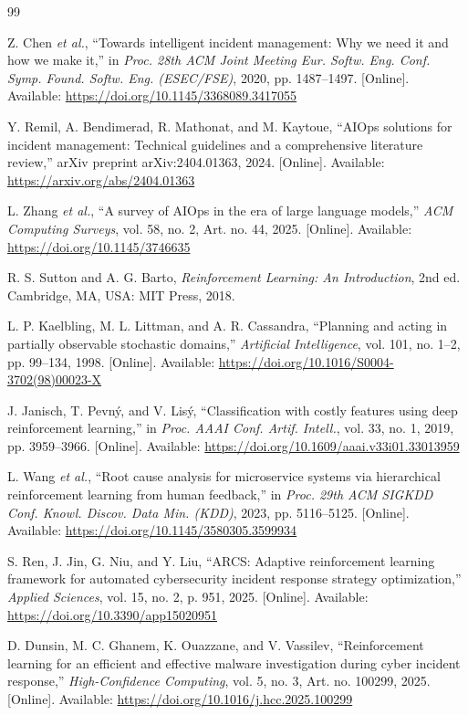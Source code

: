 \documentclass[12pt,a4paper]{article}
\begin{document}
\begin{thebibliography}{99}

 Z. Chen \emph{et al.}, ``Towards intelligent incident management: Why we need it and how we make it,'' in \emph{Proc. 28th ACM Joint Meeting Eur. Softw. Eng. Conf. Symp. Found. Softw. Eng. (ESEC/FSE)}, 2020, pp. 1487--1497. [Online]. Available: \url{https://doi.org/10.1145/3368089.3417055}

 Y. Remil, A. Bendimerad, R. Mathonat, and M. Kaytoue, ``AIOps solutions for incident management: Technical guidelines and a comprehensive literature review,'' arXiv preprint arXiv:2404.01363, 2024. [Online]. Available: \url{https://arxiv.org/abs/2404.01363}

 L. Zhang \emph{et al.}, ``A survey of AIOps in the era of large language models,'' \emph{ACM Computing Surveys}, vol. 58, no. 2, Art. no. 44, 2025. [Online]. Available: \url{https://doi.org/10.1145/3746635}

 R. S. Sutton and A. G. Barto, \emph{Reinforcement Learning: An Introduction}, 2nd ed. Cambridge, MA, USA: MIT Press, 2018.

 L. P. Kaelbling, M. L. Littman, and A. R. Cassandra, ``Planning and acting in partially observable stochastic domains,'' \emph{Artificial Intelligence}, vol. 101, no. 1--2, pp. 99--134, 1998. [Online]. Available: \url{https://doi.org/10.1016/S0004-3702(98)00023-X}

 J. Janisch, T. Pevn\'{y}, and V. Lis\'{y}, ``Classification with costly features using deep reinforcement learning,'' in \emph{Proc. AAAI Conf. Artif. Intell.}, vol. 33, no. 1, 2019, pp. 3959--3966. [Online]. Available: \url{https://doi.org/10.1609/aaai.v33i01.33013959}

 L. Wang \emph{et al.}, ``Root cause analysis for microservice systems via hierarchical reinforcement learning from human feedback,'' in \emph{Proc. 29th ACM SIGKDD Conf. Knowl. Discov. Data Min. (KDD)}, 2023, pp. 5116--5125. [Online]. Available: \url{https://doi.org/10.1145/3580305.3599934}

 S. Ren, J. Jin, G. Niu, and Y. Liu, ``ARCS: Adaptive reinforcement learning framework for automated cybersecurity incident response strategy optimization,'' \emph{Applied Sciences}, vol. 15, no. 2, p. 951, 2025. [Online]. Available: \url{https://doi.org/10.3390/app15020951}

 D. Dunsin, M. C. Ghanem, K. Ouazzane, and V. Vassilev, ``Reinforcement learning for an efficient and effective malware investigation during cyber incident response,'' \emph{High-Confidence Computing}, vol. 5, no. 3, Art. no. 100299, 2025. [Online]. Available: \url{https://doi.org/10.1016/j.hcc.2025.100299}


\end{thebibliography}
\end{document}
